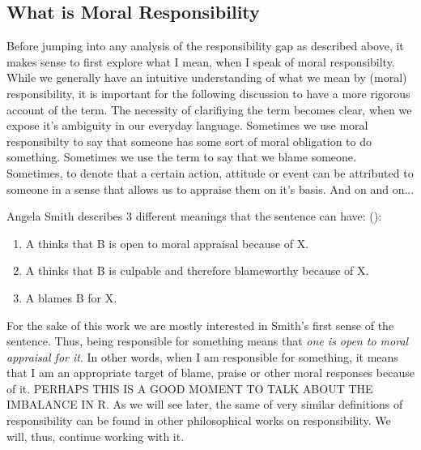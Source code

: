 \documentclass{article}
\begin{document}
\subsection{What is Moral Responsibility}

Before jumping into any analysis of the responsibility gap as described above,
it makes sense to first explore what I mean, when I speak of moral
responsibilty. While we generally have an intuitive understanding of what we mean
by (moral) responsibility, it is important for the following discussion to have
a more rigorous account of the term. The necessity of clarifiying the term
becomes clear, when we expose it's ambiguity in our everyday language.
Sometimes we use moral responsibilty to say that someone has some sort of moral
obligation to do something. Sometimes we use the term to say that we blame
someone. Sometimes, to denote that a certain action, attitude or event can be
attributed to someone in a sense that allows us to appraise them on it's basis.
And on and on...

Angela Smith describes 3 different meanings that the sentence
 can have:
(\cite[p. 469]{Smith_2007}):

\begin{enumerate}
	\item A thinks that B is open to moral appraisal because of X.\\
	\item A thinks that B is culpable and therefore blameworthy because of
		X.\\
	\item A blames B for X.
\end{enumerate}

For the sake of this work we are mostly interested in Smith's first sense of the
sentence. Thus, being responsible for something means that \textit{one is open to moral
appraisal for it}. In other words, when I am responsible for something, it means
that I am an appropriate target of blame, praise or other moral responses
because of it. PERHAPS THIS IS A GOOD MOMENT TO TALK ABOUT THE IMBALANCE IN R.
As we will see later, the same of very similar definitions of
responsibility can be found in other philosophical works on responsibility. We
will, thus, continue working with it.
\end{document}
